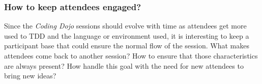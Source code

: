 \subsubsection{How to keep attendees engaged?}

Since the \textit{Coding Dojo} sessions should evolve with time as
attendees get more used to TDD and the language or environment used,
it is interesting to keep a participant base that could ensure the
normal flow of the session. What makes attendees come back to another
session? How to ensure that those characteristics are always present?
How handle this goal with the need for new attendees to bring new
ideas?
